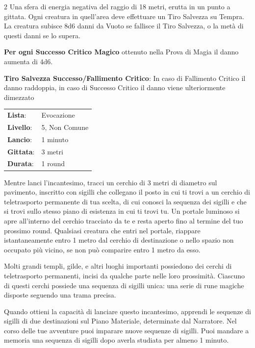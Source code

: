 \begin{multicols}{2}
Una sfera di energia negativa del raggio di 18 metri, erutta in un punto a gittata. Ogni creatura in quell'area deve effettuare un Tiro Salvezza su Tempra. La creatura subisce 8d6 danni da Vuoto se fallisce il Tiro Salvezza, o la metà di questi danni se lo supera.

\textbf{Per ogni Successo Critico Magico} ottenuto nella Prova di Magia il danno aumenta di 4d6.

\textbf{Tiro Salvezza Successo/Fallimento Critico}: In caso di Fallimento Critico il danno raddoppia, in caso di Successo Critico il danno viene ulteriormente dimezzato

\noindent\begin{tabularx}{\linewidth}{p{1.9cm}X}
	\rowcolor{gray!20}\textbf{Lista}: & Evocazione \\
	\textbf{Livello}: & 5, Non Comune \\
	\rowcolor{gray!20}\textbf{Lancio}: & 1 minuto \\
	\textbf{Gittata}: & 3 metri \\
	\rowcolor{gray!20}\textbf{Durata}: & 1 round \\
\end{tabularx}\smallskip

Mentre lanci l'incantesimo, tracci un cerchio di 3 metri di diametro sul pavimento, inscritto con sigilli che collegano il posto in cui ti trovi a un cerchio di teletrasporto permanente di tua scelta, di cui conosci la sequenza dei sigilli e che si trovi sullo stesso piano di esistenza in cui ti trovi tu. Un portale luminoso si apre all'interno del cerchio tracciato da te e resta aperto fino al termine del tuo prossimo round. Qualsiasi creatura che entri nel portale, riappare istantaneamente entro 1 metro dal cerchio di destinazione o nello spazio non occupato più vicino, se non può comparire entro 1 metro da esso.

Molti grandi templi, gilde, e altri luoghi importanti possiedono dei cerchi di teletrasporto permanenti, incisi da qualche parte nelle loro prossimità. Ciascuno di questi cerchi possiede una sequenza di sigilli unica: una serie di rune magiche disposte seguendo una trama precisa.

Quando ottieni la capacità di lanciare questo incantesimo, apprendi le sequenze di sigilli di due destinazioni sul Piano Materiale, determinate dal Narratore. Nel corso delle tue avventure puoi imparare nuove sequenze di sigilli. Puoi mandare a memoria una sequenza di sigilli dopo averla studiata per almeno 1 minuto.


\end{multicols}

